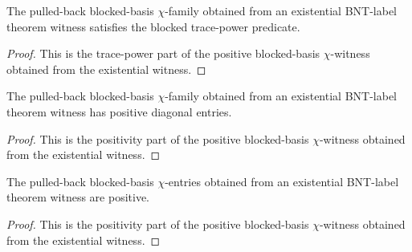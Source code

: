 \begin{theorem}%
    \label{thm:mpdo_bnt_label_theorem_witness_positive_blocked_chi_trace_power}
    \leanok
    The pulled-back blocked-basis $\chi$-family obtained from an existential
    BNT-label theorem witness satisfies the blocked trace-power predicate.
\end{theorem}
\begin{proof}\leanok
    This is the trace-power part of the positive blocked-basis
    $\chi$-witness obtained from the existential witness.
\end{proof}

\begin{theorem}%
    \label{thm:mpdo_bnt_label_theorem_witness_positive_blocked_chi_pos_entries}
    \leanok
    The pulled-back blocked-basis $\chi$-family obtained from an existential
    BNT-label theorem witness has positive diagonal entries.
\end{theorem}
\begin{proof}\leanok
    This is the positivity part of the positive blocked-basis
    $\chi$-witness obtained from the existential witness.
\end{proof}

\begin{theorem}%
    \label{thm:mpdo_bnt_label_theorem_witness_positive_blocked_chi_entry_pos}
    \leanok
    The pulled-back blocked-basis $\chi$-entries obtained from an
    existential BNT-label theorem witness are positive.
\end{theorem}
\begin{proof}\leanok
    This is the positivity part of the positive blocked-basis
    $\chi$-witness obtained from the existential witness.
\end{proof}

